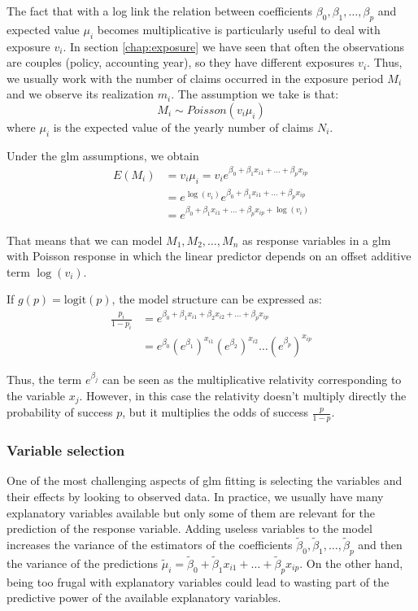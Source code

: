 \documentclass[a4paper, twoside, openright, 12pt]{report}
\theoremstyle{definition}
\theoremstyle{definition}
\theoremstyle{definition}
\theoremstyle{remark}
\begin{document}
The fact that with a log link the relation between coefficients \(\beta_0, \beta_1, \dots, \beta_p\) and expected value \(\mu_i\) becomes multiplicative is particularly useful to deal with exposure \(v_i\). In section \ref{chap:exposure} we have seen that often the observations are couples (policy, accounting year), so they have different exposures \(v_i\). Thus, we usually work with the number of claims occurred in the exposure period \(M_i\) and we observe its realization \(m_i\). The assumption we take is that:
\[M_i \sim Poisson(v_i \mu_i)\]
where \(\mu_i\) is the expected value of the yearly number of claims \(N_i\).

Under the \ac{glm} assumptions, we obtain
\begin{align*}
E(M_i) & = v_i \mu_i = v_i e^{\beta_0 + \beta_1 x_{i1} + \dots + \beta_p x_{ip}} \\
& = e^{\log(v_i)}e^{\beta_0 + \beta_1 x_{i1} + \dots + \beta_p x_{ip}} \\
& = e^{\beta_0 + \beta_1 x_{i1} + \dots + \beta_p x_{ip} + \log(v_i)}
\end{align*}

That means that we can model \(M_1, M_2, \dots, M_n\) as response variables in a \ac{glm} with Poisson response in which the linear predictor depends on an offset additive term \(\log(v_i)\).

If \(g(p) = \text{logit}(p)\), the model structure can be expressed as:
\begin{align*}
\frac{p_i}{1-p_i} & = e^{\beta_0 + \beta_1 x_{i1} + \beta_2 x_{i2} + \dots + \beta_p x_{ip}} \\
& = e^{\beta_0} \left(e^{\beta_1}\right)^{x_{i1}} \left(e^{\beta_2}\right)^{x_{i2}} \dots \left(e^{\beta_p}\right)^{x_{ip}}
\end{align*}

Thus, the term \(e^{\beta_j}\) can be seen as the multiplicative relativity corresponding to the variable \(x_j\). However, in this case the relativity doesn't multiply directly the probability of success \(p\), but it multiplies the odds of success \(\frac{p}{1-p}\).

\hypertarget{chap:variable-selection}{%
\subsubsection{Variable selection}\label{chap:variable-selection}}

One of the most challenging aspects of \ac{glm} fitting is selecting the variables and their effects by looking to observed data. In practice, we usually have many explanatory variables available but only some of them are relevant for the prediction of the response variable. Adding useless variables to the model increases the variance of the estimators of the coefficients \(\tilde{\beta}_0, \tilde{\beta}_1, \dots, \tilde{\beta}_p\) and then the variance of the predictions \(\tilde{\mu}_i = \tilde{\beta}_0 + \tilde{\beta}_1 x_{i1} + \dots + \tilde{\beta}_p x_{ip}\). On the other hand, being too frugal with explanatory variables could lead to wasting part of the predictive power of the available explanatory variables.
\end{document}
